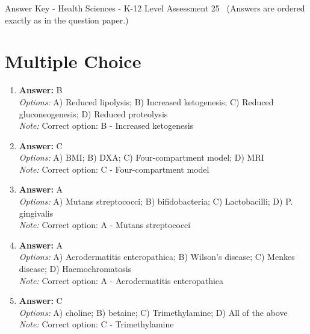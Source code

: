 \documentclass[12pt]{article}
\begin{document}
\begin{center}
Answer Key - Health Sciences - K-12 Level Assessment 25 \
\small (Answers are ordered exactly as in the question paper.)
\end{center}

\section*{Multiple Choice}
\begin{enumerate}[label=\arabic*.]
\item \textbf{Answer:} B
\\ \textit{Options:} A) Reduced lipolysis; B) Increased ketogenesis; C) Reduced gluconeogenesis; D) Reduced proteolysis
\\ \textit{Note:} Correct option: B - Increased ketogenesis
\item \textbf{Answer:} C
\\ \textit{Options:} A) BMI; B) DXA; C) Four-compartment model; D) MRI
\\ \textit{Note:} Correct option: C - Four-compartment model
\item \textbf{Answer:} A
\\ \textit{Options:} A) Mutans streptococci; B) bifidobacteria; C) Lactobacilli; D) P. gingivalis
\\ \textit{Note:} Correct option: A - Mutans streptococci
\item \textbf{Answer:} A
\\ \textit{Options:} A) Acrodermatitis enteropathica; B) Wilson's disease; C) Menkes disease; D) Haemochromatosis
\\ \textit{Note:} Correct option: A - Acrodermatitis enteropathica
\item \textbf{Answer:} C
\\ \textit{Options:} A) choline; B) betaine; C) Trimethylamine; D) All of the above
\\ \textit{Note:} Correct option: C - Trimethylamine
\end{enumerate}
\end{document}
